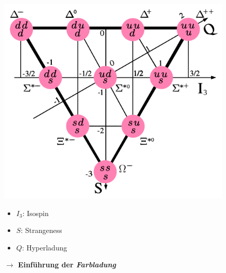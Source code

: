 \documentclass[aspectratio=169]{beamer} %
\begin{document}
    \begin{frame}%
      \begin{figure}
        \centering
        \begin{minipage}{0.6\textwidth}
          \centering
          \includegraphics[width=\textwidth, keepaspectratio, height=0.9\textheight]{538px-Baryon-decuplet-small.svg.png}
        \end{minipage}
        \hfill
        \begin{minipage}{0.38\textwidth}
          \begin{itemize}
            \item $I_3$: Isospin
            \item $S$: Strangeness
            \item $Q$: Hyperladung
          \end{itemize}
          \vspace*{0,5cm}
          \normalsize{\textbf{{$\rightarrow$ Einführung der \emph{Farbladung}}}}\vspace*{1cm}
          
          \scriptsize %
        \end{minipage}
      \end{figure} %
    \end{frame}
    
\end{document}
